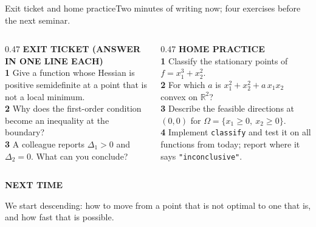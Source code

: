 \documentclass[aspectratio=169,11pt]{beamer}
\newcommand{\kicker}[1]{{\color{hseaccent}\scriptsize\bfseries\MakeUppercase{#1}}}
\newcommand{\takeaway}[2]{%
  \par\smallskip\noindent
  \colorbox{hselight}{\parbox{\dimexpr\textwidth-2\fboxsep}{%
    \kicker{#1}\par\vspace{0.12em}\footnotesize #2}}\par}
\newcommand{\num}[1]{{\color{hseaccent}\bfseries #1}}
\begin{document}
\begin{frame}{Exit ticket and home practice}{Two minutes of writing now; four exercises before the next seminar.}
  \vspace{0.3em}
  \begin{columns}[T,onlytextwidth]
    \begin{column}{0.47\textwidth}
      \kicker{exit ticket (answer in one line each)}\\[0.4em]
      {\small
        \num{1} Give a function whose Hessian is positive semidefinite at a point that is not a local minimum.\\[0.4em]
        \num{2} Why does the first-order condition become an inequality at the boundary?\\[0.4em]
        \num{3} A colleague reports $\Delta_1>0$ and $\Delta_2=0$. What can you conclude?}
    \end{column}
    \begin{column}{0.47\textwidth}
      \kicker{home practice}\\[0.4em]
      {\small
        \num{1} Classify the stationary points of $f=x_1^3+x_2^2$.\\[0.4em]
        \num{2} For which $a$ is $x_1^2+x_2^2+a\,x_1x_2$ convex on $\mathbb{R}^2$?\\[0.4em]
        \num{3} Describe the feasible directions at $(0,0)$ for $\Omega=\{x_1\ge0,\ x_2\ge0\}$.\\[0.4em]
        \num{4} Implement \texttt{classify} and test it on all functions from today; report where it says
        \texttt{"inconclusive"}.}
    \end{column}
  \end{columns}
  \vspace{0.4em}
  \takeaway{next time}{We start descending: how to move from a point that is not optimal to one that is,
    and how fast that is possible.}
\end{frame}
\end{document}
